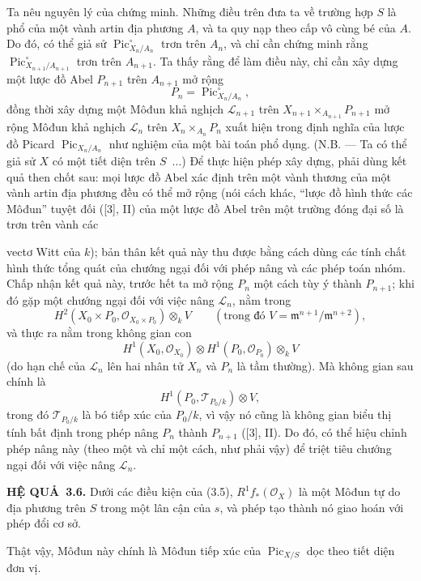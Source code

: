 \documentclass[11pt,twoside,openany]{book}
\numberwithin{equation}{section}
\newcommand{\src}[1]{%
  \phantomsection\hypertarget{src:\fgasourceid:#1}{}%
  \marginpar{\raggedleft\footnotesize\sffamily #1}%
}
\newcommand{\fgasourceid}{unset}
\newcommand{\result}[2]{\par\medskip\noindent\textbf{#1\if\relax\detokenize{#2}\relax\else\ #2\fi.}\quad}
\begin{document}
Ta nêu nguyên lý của chứng minh. Những điều trên đưa ta về trường hợp $S$ là
phổ của một vành artin địa phương $A$, và ta quy nạp theo cấp vô cùng bé của
$A$. Do đó, có thể giả sử $\operatorname{Pic}_{X_n/A_n}^\circ$ trơn trên
$A_n$, và chỉ cần chứng minh rằng
$\operatorname{Pic}_{X_{n+1}/A_{n+1}}^\circ$ trơn trên $A_{n+1}$. Ta thấy
rằng để làm điều này, chỉ cần xây dựng một lược đồ Abel $P_{n+1}$ trên
$A_{n+1}$ mở rộng
\[
P_n=\operatorname{Pic}_{X_n/A_n}^\circ,
\]
đồng thời xây dựng một Môđun khả nghịch $\mathcal L_{n+1}$ trên
$X_{n+1}\times_{A_{n+1}}P_{n+1}$ mở rộng Môđun khả nghịch $\mathcal L_n$
trên $X_n\times_{A_n}P_n$ xuất hiện trong định nghĩa của lược đồ Picard
$\operatorname{Pic}_{X_n/A_n}$ như nghiệm của một bài toán phổ dụng. (N.B. ---
Ta có thể giả sử $X$ có một tiết diện trên $S$~...) Để thực hiện phép xây dựng,
phải dùng kết quả then chốt sau: mọi lược đồ Abel xác định trên một vành thương
của một vành artin địa phương đều có thể mở rộng (nói cách khác, ``lược đồ
hình thức các Môđun'' tuyệt đối ([3], II) của một lược đồ Abel trên một trường
đóng đại số là trơn trên vành các
\src{240}
vectơ Witt của $k$); bản thân kết quả này thu được bằng cách dùng các tính chất
hình thức tổng quát của chướng ngại đối với phép nâng và các phép toán nhóm.
Chấp nhận kết quả này, trước hết ta mở rộng $P_n$ một cách tùy ý thành
$P_{n+1}$; khi đó gặp một chướng ngại đối với việc nâng $\mathcal L_n$, nằm
trong
\[
H^2(X_0\times P_0,\mathcal O_{X_0\times P_0})\otimes_k V
\qquad(\text{trong đó }V=\mathfrak m^{n+1}/\mathfrak m^{n+2}),
\]
và thực ra nằm trong không gian con
\[
H^1(X_0,\mathcal O_{X_0})\otimes
H^1(P_0,\mathcal O_{P_0})\otimes_k V
\]
(do hạn chế của $\mathcal L_n$ lên hai nhân tử $X_n$ và $P_n$ là tầm thường).
Mà không gian sau chính là
\[
H^1(P_0,\mathcal T_{P_0/k})\otimes V,
\]
trong đó $\mathcal T_{P_0/k}$ là bó tiếp xúc của $P_0/k$, vì vậy nó cũng là
không gian biểu thị tính bất định trong phép nâng $P_n$ thành $P_{n+1}$ ([3],
II). Do đó, có thể hiệu chỉnh phép nâng này (theo một và chỉ một cách, như phải
vậy) để triệt tiêu chướng ngại đối với việc nâng $\mathcal L_n$.

\result{HỆ QUẢ}{3.6} Dưới các điều kiện của (3.5),
$R^1f_*(\mathcal O_X)$ là một Môđun tự do địa phương trên $S$ trong một lân
cận của $s$, và phép tạo thành nó giao hoán với phép đổi cơ sở.

Thật vậy, Môđun này chính là Môđun tiếp xúc của
$\operatorname{Pic}_{X/S}$ dọc theo tiết diện đơn vị.
\end{document}
